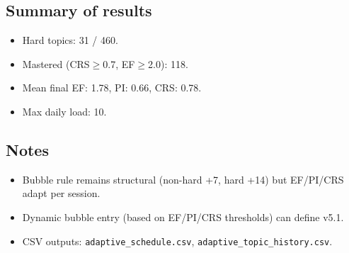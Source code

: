 \documentclass[12pt]{article}
\begin{document}
\subsection*{Summary of results}
\begin{itemize}
  \item Hard topics: 31 / 460.
  \item Mastered (CRS$\ge$0.7, EF$\ge$2.0): 118.
  \item Mean final EF: 1.78, PI: 0.66, CRS: 0.78.
  \item Max daily load: 10.
\end{itemize}

\subsection*{Notes}
\begin{itemize}
  \item Bubble rule remains structural (non-hard +7, hard +14) but EF/PI/CRS adapt per session.
  \item Dynamic bubble entry (based on EF/PI/CRS thresholds) can define v5.1.
  \item CSV outputs: \texttt{adaptive\_schedule.csv}, \texttt{adaptive\_topic\_history.csv}.
\end{itemize}
\end{document}
